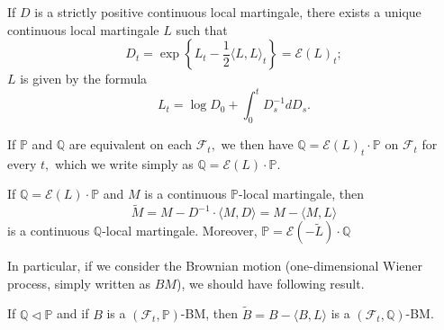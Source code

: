 \begin{proposition}
	If $D$ is a strictly positive continuous local martingale, there exists a unique continuous local martingale $L$ such that \[ D_{t}=\exp \left\{L_{t}-\frac{1}{2}\langle L, L\rangle_{t}\right\}=\mathscr{E}(L)_{t} ;\]
	$ L $ is given by the formula
	\[ L_{t}=\log D_{0}+\int_{0}^{t} D_{s}^{-1} d D_{s}. \]
\end{proposition}
If $\mathbb{P}$ and $\mathbb{Q}$ are equivalent on each $\mathcal{ F}_{t},$ we then have $\mathbb{Q}=\mathscr{E}(L)_{t} \cdot \mathbb{P}$ on $\mathcal{F}_{t}$ for every $t,$ which we write simply as $\mathbb{Q}=\mathscr{E}(L) \cdot \mathbb{P} .$
\begin{theorem}
	If $\mathbb{Q}=\mathscr{E}(L) \cdot \mathbb{P}$ and $M$ is a continuous $\mathbb{P}$-local martingale, then
	\[ \widetilde{M}=M-D^{-1} \cdot\langle M, D\rangle=M-\langle M, L\rangle \]
	is a continuous $\mathbb{Q}$-local martingale. Moreover, $\mathbb{P}=\mathscr{E}(-\widetilde{L})\cdot \mathbb{Q}$
\end{theorem}

In particular, if we consider the Brownian motion (one-dimensional Wiener process, simply written as $ BM $), we should have following result.
\begin{theorem}\label{thm:Girsanov_we_use}
	If $\mathbb{Q} \lhd \mathbb{P}$ and if $B$ is a $\left(\mathcal{F}_{t}, \mathbb{P}\right)$-BM, then $\widetilde{B}=B-\langle B, L\rangle$ is a $\left(\mathcal{F}_{t}, \mathbb{Q}\right)$-BM.
\end{theorem}


